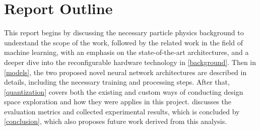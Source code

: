 \section{Report Outline}
This report begins by discussing the necessary particle physics background to understand the scope of the work, followed by the related work in the field of machine learning, with an emphasis on the state-of-the-art architectures, and a deeper dive into the reconfigurable hardware technology in \cref{background}. Then in \cref{models}, the two proposed novel neural network architectures are described in details, including the necessary training and processing steps. After that, \cref{quantization} covers both the existing and custom ways of conducting design space exploration and how they were applies in this project.  discusses the evaluation metrics and collected experimental results, which is concluded by \cref{conclusion}, which also proposes future work derived from this analysis.

